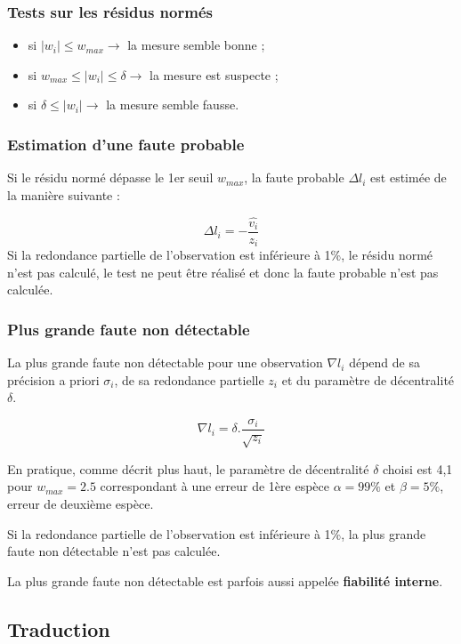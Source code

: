 \documentclass[french]{report}
\begin{document}
\subsubsection{Tests sur les résidus normés}

\begin{itemize}
\item si $\lvert w_i \rvert \leq w_{max} \rightarrow$ la mesure semble bonne ;
\item si $w_{max} \leq \lvert w_i \rvert \leq \delta \rightarrow$ la mesure est suspecte ;
\item si $\delta \leq \lvert w_i \rvert  \rightarrow$ la mesure semble fausse.
\end{itemize}


\subsubsection{Estimation d'une faute probable}

Si le résidu normé dépasse le 1er seuil $w_{max}$, la faute probable $\Delta l_{i}$ est estimée de la manière suivante :

$$\Delta l_{i}=-\frac{\hat{v_i}}{z_i}$$
Si la redondance partielle de l'observation est inférieure à 1\%, le résidu normé n'est pas calculé, le test ne peut être réalisé et donc la faute probable n'est pas calculée.


\subsubsection{Plus grande faute non détectable}

La plus grande faute non détectable pour une observation $\nabla l_i$ dépend de sa précision a priori $\sigma_i$,
de sa redondance partielle $z_i$ et du paramètre de décentralité $\delta$.

$$\nabla l_i=\delta.\frac{\sigma_i}{\sqrt{z_i}}$$

En pratique, comme décrit plus haut, le paramètre de décentralité $\delta$ choisi est 4,1 pour $w_{max}=2.5$ correspondant à une erreur de 1ère espèce $\alpha=99\%$ et $\beta=5\%$, erreur de deuxième espèce.

Si la redondance partielle de l'observation est inférieure à 1\%, la plus grande faute non détectable n'est pas calculée.

La plus grande faute non détectable est parfois aussi appelée \textbf{fiabilité interne}.


\subsection{Traduction}
\end{document}
